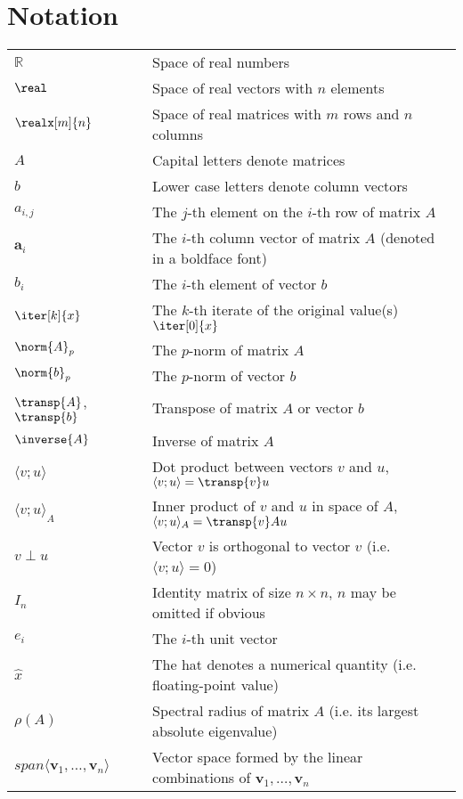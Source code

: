 \section{Notation}
\label{sec:notation}


\begin{tabular}{ll}
  $\mathbb{R}$ & Space of real numbers \\
  $\real$ & Space of real vectors with $n$ elements \\
  $\realx[m]{n}$ & Space of real matrices with $m$ rows and $n$ columns \\
  $A$ & Capital letters denote matrices \\
  $b$ & Lower case letters denote column vectors \\
  $a_{i,j}$ & The $j$-th element on the $i$-th row of matrix $A$ \\
  $\bm{a}_{i}$ & The $i$-th column vector of matrix $A$ (denoted in a boldface font) \\
  $b_{i}$ & The $i$-th element of vector $b$ \\
  $\iter[k]{x}$ & The $k$-th iterate of the original value(s) $\iter[0]{x}$\\
  $\norm{A}_p$ & The $p$-norm of matrix $A$ \\
  $\norm{b}_p$ & The $p$-norm of vector $b$ \\
  $\transp{A}$, $\transp{b}$    & Transpose of matrix $A$ or vector $b$\\
  $\inverse{A}$ & Inverse of matrix $A$ \\
  $\langle v;u \rangle$ & Dot product between vectors $v$ and $u$, $\langle v;u \rangle = \transp{v}u$\\
  $\langle v;u \rangle_A$ & Inner product of $v$ and $u$ in space of $A$, $\langle v;u \rangle_A = \transp{v}Au$\\
  $v \perp u$ & Vector $v$ is orthogonal to vector $v$ (i.e. $\langle v;u \rangle = 0$) \\
  $I_n$      & Identity matrix of size $n \times n$, $n$ may be omitted if obvious  \\
  $e_i$      & The $i$-th unit vector \\
  $\hat{x}$ & The hat denotes a numerical quantity (i.e. floating-point value) \\
  $\rho(A)$ & Spectral radius of matrix $A$ (i.e. its largest absolute eigenvalue) \\
  $span\langle \bm{v}_1, \dots, \bm{v}_{n} \rangle$ & Vector space formed by the linear combinations of $\bm{v}_1,\dots,\bm{v}_n$ \\

\end{tabular}
